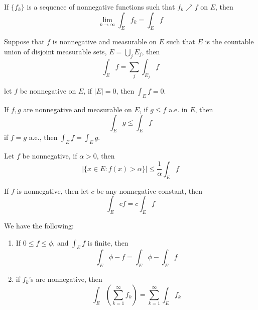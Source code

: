 \documentclass[openany]{book}
\begin{document}
\begin{thm}
    If $\{f_k\}$ is a sequence of nonnegative functions such that $f_k\nearrow f$ on $E$, then 
    \begin{equation*}
        \lim_{k\to\infty}\int_Ef_k=\int_Ef
    \end{equation*}
\end{thm}
\begin{prop}
    Suppose that $f$ is nonnegative and measurable on $E$ such that $E$ is the countable union of disjoint measurable sets, $E=\bigcup_jE_j$, then 
    \begin{equation*}
        \int_Ef=\sum_j\int_{E_j}f
    \end{equation*}
\end{prop}
\begin{prop}
    let $f$ be nonnegative on $E$, if $|E|=0$, then $\int_Ef=0$.

    If $f,g$ are nonnegative and measurable on $E$, if $g\leq f$ a.e. in $E$, then 
    \begin{equation*}
        \int_Eg\leq\int_Ef
    \end{equation*}
    if $f=g$ a.e., then $\int_Ef=\int_Eg$.
\end{prop}
\begin{thm}[Chebyshev]
    Let $f$ be nonnegative, if $\alpha>0$, then 
    \begin{equation*}
        |\{x\in E: f(x)>\alpha\}|\leq\frac{1}{\alpha}\int_Ef
    \end{equation*}
\end{thm}
\begin{prop}
    If $f$ is nonnegative, then let $c$ be any nonnegative constant, then 
    \begin{equation*}
        \int_Ecf=c\int_Ef
    \end{equation*}
\end{prop}
\begin{prop}
    We have the following:
    \begin{enumerate}
        \item If $0\leq f\leq\phi$, and $\int_Ef$ is finite, then 
        \begin{equation*}
            \int_E\phi-f=\int_E\phi-\int_Ef
        \end{equation*}
        \item if $f_k$'s are nonnegative, then 
        \begin{equation*}
            \int_E\left(\sum_{k=1}^\infty f_k\right)=\sum_{k=1}^\infty\int_Ef_k
        \end{equation*}
    \end{enumerate}
\end{prop}
\end{document}
